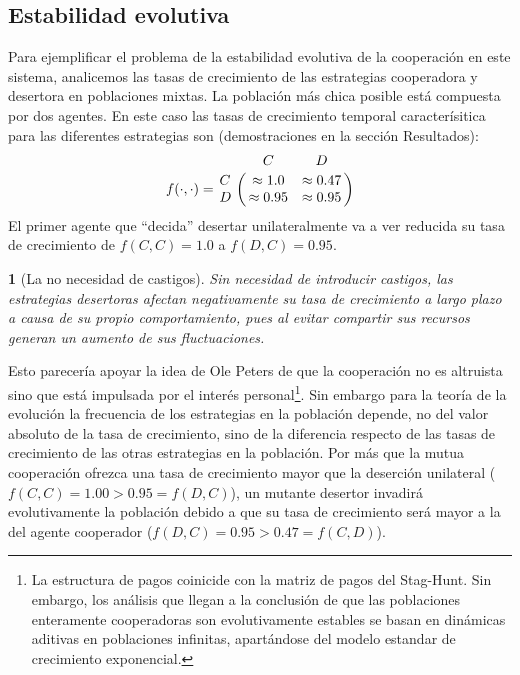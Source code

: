 \documentclass[a4paper,10pt]{article}
\newif\ifen
\newif\ifes
\newcommand{\en}[1]{\ifen#1\fi}
\newcommand{\es}[1]{\ifes#1\fi}
\newtheorem{conclution}{\en{Conclution}\es{Conclusión}}%
\begin{document}


\subsection{Estabilidad evolutiva}

Para ejemplificar el problema de la estabilidad evolutiva de la cooperación en este sistema, analicemos las tasas de crecimiento de las estrategias cooperadora y desertora en poblaciones mixtas.
La población más chica posible está compuesta por dos agentes.
En este caso las tasas de crecimiento temporal caracterísitica para las diferentes estrategias son (demostraciones en la sección Resultados):
%
\begin{equation}
   f(\cdot,\cdot) = \bordermatrix{ & C & D \cr
      C & \approx 1.0 & \approx 0.47 \cr
      D & \approx 0.95 & \approx 0.95 } 
\end{equation}
%
El primer agente que ``decida'' desertar unilateralmente va a ver reducida su tasa de crecimiento de $f(C,C) = 1.0$ a $ f(D,C) = 0.95$.
% 
\begin{conclution}[La no necesidad de castigos]
Sin necesidad de introducir castigos, las estrategias desertoras afectan negativamente su tasa de crecimiento a largo plazo a causa de su propio comportamiento, pues al evitar compartir sus recursos generan un aumento de sus fluctuaciones.
\end{conclution}

Esto parecería apoyar la idea de Ole Peters de que la cooperación no es altruista sino que está impulsada por el interés personal\footnote{
La estructura de pagos coinicide con la matriz de pagos del Stag-Hunt. Sin embargo, los análisis que llegan a la conclusión de que las poblaciones enteramente cooperadoras son evolutivamente estables se basan en dinámicas aditivas en poblaciones infinitas, apartándose del modelo estandar de crecimiento exponencial.}.
Sin embargo para la teoría de la evolución la frecuencia de los estrategias en la población depende, no del valor absoluto de la tasa de crecimiento, sino de la diferencia respecto de las tasas de crecimiento de las otras estrategias en la población.
Por más que la mutua cooperación ofrezca una tasa de crecimiento mayor que la deserción unilateral ($f(C,C) = 1.00 > 0.95 = f(D,C)$), un mutante desertor invadirá evolutivamente la población debido a que su tasa de crecimiento será mayor a la del agente cooperador ($f(D,C) = 0.95 > 0.47 = f(C,D)$). 
\end{document}
